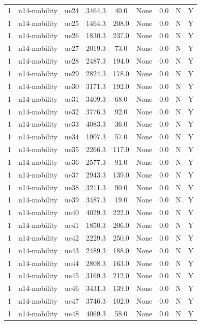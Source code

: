 \begin{table}[ht]
\begin{tabular}{|c|c|c|c|c|c|c|c|c|}
1 & n14-mobility & ue24 & 3464.3 & 40.0 & None & 0.0 & N & Y \\
1 & n14-mobility & ue25 & 1464.3 & 208.0 & None & 0.0 & N & Y \\
1 & n14-mobility & ue26 & 1830.3 & 237.0 & None & 0.0 & N & Y \\
1 & n14-mobility & ue27 & 2019.3 & 73.0 & None & 0.0 & N & Y \\
1 & n14-mobility & ue28 & 2487.3 & 194.0 & None & 0.0 & N & Y \\
1 & n14-mobility & ue29 & 2824.3 & 178.0 & None & 0.0 & N & Y \\
1 & n14-mobility & ue30 & 3171.3 & 192.0 & None & 0.0 & N & Y \\
1 & n14-mobility & ue31 & 3409.3 & 68.0 & None & 0.0 & N & Y \\
1 & n14-mobility & ue32 & 3776.3 & 92.0 & None & 0.0 & N & Y \\
1 & n14-mobility & ue33 & 4083.3 & 36.0 & None & 0.0 & N & Y \\
1 & n14-mobility & ue34 & 1907.3 & 57.0 & None & 0.0 & N & Y \\
1 & n14-mobility & ue35 & 2266.3 & 117.0 & None & 0.0 & N & Y \\
1 & n14-mobility & ue36 & 2577.3 & 91.0 & None & 0.0 & N & Y \\
1 & n14-mobility & ue37 & 2943.3 & 139.0 & None & 0.0 & N & Y \\
1 & n14-mobility & ue38 & 3211.3 & 90.0 & None & 0.0 & N & Y \\
1 & n14-mobility & ue39 & 3487.3 & 19.0 & None & 0.0 & N & Y \\
1 & n14-mobility & ue40 & 4029.3 & 222.0 & None & 0.0 & N & Y \\
1 & n14-mobility & ue41 & 1850.3 & 206.0 & None & 0.0 & N & Y \\
1 & n14-mobility & ue42 & 2229.3 & 250.0 & None & 0.0 & N & Y \\
1 & n14-mobility & ue43 & 2489.3 & 188.0 & None & 0.0 & N & Y \\
1 & n14-mobility & ue44 & 2808.3 & 163.0 & None & 0.0 & N & Y \\
1 & n14-mobility & ue45 & 3169.3 & 212.0 & None & 0.0 & N & Y \\
1 & n14-mobility & ue46 & 3431.3 & 139.0 & None & 0.0 & N & Y \\
1 & n14-mobility & ue47 & 3746.3 & 102.0 & None & 0.0 & N & Y \\
1 & n14-mobility & ue48 & 4069.3 & 58.0 & None & 0.0 & N & Y \\

\end{tabular}
\end{table}
